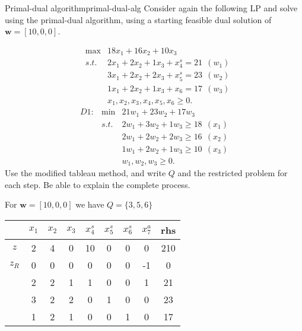\begin{example}{Primal-dual algorithm}{primal-dual-alg}
Consider again the following LP and solve using the primal-dual algorithm, using a starting feasible dual solution of $\mathbf{w} = [10,0,0]$.
\end{example}
\begin{solution}

\begin{eqnarray}
& \max  & 18x_1 + 16x_2 + 10x_3  \nonumber \\
& s.t. & 2x_1 + 2x_2 + 1x_3 +x^s_4 = 21~~ (w_1) \nonumber \\
&      & 3x_1 + 2x_2 + 2x_3 + x^s_5 = 23~~ (w_2) \nonumber \\
&      & 1x_1 + 2x_2 + 1x_3 +x_6 = 17~~ (w_3) \nonumber \\
&      & x_1, x_2, x_3, x_4, x_5, x_6 \ge 0. \nonumber
\end{eqnarray}
\begin{eqnarray}
D1:& \min  & 21w_1 +23w_2 +17w_3  \nonumber \\
   & s.t. & 2w_1 +3w_2 + 1w_3 \ge 18~~ (x_1) \nonumber \\
   &      & 2w_1 +2w_2 + 2w_3 \ge 16~~ (x_2) \nonumber \\
   &      & 1w_1 +2w_2 + 1w_3 \ge 10~~ (x_3) \nonumber \\
   &      & w_1, w_2, w_3 \ge 0. \nonumber
\end{eqnarray}
Use the modified tableau method, and write $Q$ and the restricted problem for each step.  Be able to explain the complete process.

For $\mathbf{w} = [10,0,0]$ we have $Q=\{3,5,6\}$
\begin{center} \begin{tabular} {|c|c|c|c|c|c|c|c|c|}
\hline       & $x_1$ & $x_2$ & $x_3$ & $x^s_4$ & $x^s_5$ & $x^s_6$ &$x^a_7$ & rhs   \\ \hline
\hline $z$   & 2     & 4     & 0      & 10   & 0     & 0     &  0    & 210   \\
\hline $z_R$ & 0     & 0     & 0      & 0    & 0     & 0     & -1    & 0     \\
\hline       & 2     & 2     & 1      & 1    & 0     & 0     & 1     & 21    \\
\hline       & 3     & 2     & 2      & 0    & 1     & 0     & 0     & 23   \\
\hline       & 1     & 2     & 1      & 0    & 0     & 1     & 0     & 17   \\ \hline
\end{tabular} \end{center} \label{T1}


\end{solution}
